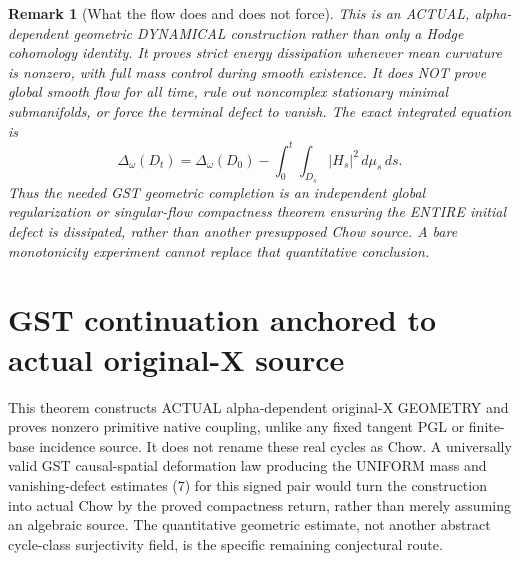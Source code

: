 \documentclass[11pt]{article}
\newtheorem{remark}[theorem]{Remark}
\begin{document}
\begin{remark}[What the flow does and does not force]
This is an ACTUAL,
alpha-dependent geometric
DYNAMICAL construction
rather than only a
Hodge cohomology
identity. It proves
strict energy dissipation
whenever mean curvature
is nonzero, with full
mass control during
smooth existence.
It does NOT prove
global smooth flow
for all time, rule out
noncomplex stationary
minimal submanifolds,
or force the terminal
defect to vanish.
The exact integrated
equation is
\[
 \Delta_\omega(D_{t})
 =\Delta_\omega(D_0)
   -\int_0^t\int_{D_s}
                   |H_s|^2\,d\mu_s\,ds .
                                                               \tag{13}
\]
Thus the needed
GST geometric completion
is an independent
global regularization
or singular-flow
compactness theorem
ensuring the ENTIRE
initial defect is
dissipated, rather
than another presupposed
Chow source.
A bare monotonicity
experiment cannot
replace that
quantitative conclusion.
\end{remark}

\section{GST continuation anchored to actual original-X source}
This theorem constructs ACTUAL alpha-dependent
original-X GEOMETRY and proves nonzero
primitive native coupling, unlike any
fixed tangent PGL or finite-base incidence
source. It does not rename these real
cycles as Chow. A universally valid GST
causal-spatial deformation law producing
the UNIFORM mass and vanishing-defect
estimates (7) for this signed pair would
turn the construction into actual Chow
by the proved compactness return, rather
than merely assuming an algebraic source.
The quantitative geometric estimate,
not another abstract cycle-class
surjectivity field, is the specific
remaining conjectural route.
\end{document}
